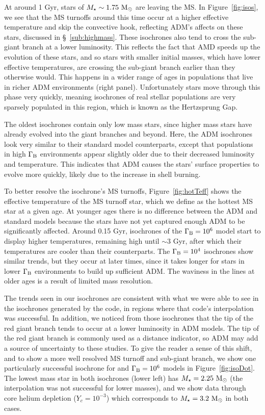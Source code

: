 \documentclass[useAMS,usenatbib]{mnras}
\begin{document}
At around 1 Gyr, stars of $M_{\star} \sim 1.75 \ \mathrm{M}_{\odot}$ are leaving the MS. In Figure~\ref{fig:isos}, we see that the MS turnoffs around this time occur at a higher effective temperature and skip the convective hook, reflecting ADM's affects on these stars, discussed in \S~\ref{sub:highmass}. These isochrones also tend to cross the sub-giant branch at a lower luminosity. This reflects the fact that AMD speeds up the evolution of these stars, and so stars with smaller initial masses, which have lower effective temperatures, are crossing the sub-giant branch earlier than they otherwise would. This happens in a wider range of ages in populations that live in richer ADM environments (right panel). Unfortunately stars move through this phase very quickly, meaning isochrones of real stellar populations are very sparsely populated in this region, which is known as the Hertzsprung Gap.

The oldest isochrones contain only low mass stars, since higher mass stars have already evolved into the giant branches and beyond. Here, the ADM isochrones look very similar to their standard model counterparts, except that populations in high $\Gamma_\mathrm{B}$ environments appear slightly older due to their decreased luminosity and temperature. This indicates that ADM causes the stars' surface properties to evolve more quickly, likely due to the increase in shell burning.

To better resolve the isochrone's MS turnoffs, Figure~\ref{fig:hotTeff} shows the effective temperature of the MS turnoff star, which we define as the hottest MS star at a given age. At younger ages there is no difference between the ADM and standard models because the stars have not yet captured enough ADM to be significantly affected. Around 0.15 Gyr, isochrones of the $\Gamma_\mathrm{B} = 10^{6}$ model start to display higher temperatures, remaining high until $\sim 3$ Gyr, after which their temperatures are cooler than their \nodm counterparts. The $\Gamma_\mathrm{B} = 10^{4}$ isochrones show similar trends, but they occur at later times, since it takes longer for stars in lower $\Gamma_\mathrm{B}$ environments to build up sufficient ADM. The waviness in the lines at older ages is a result of limited mass resolution.

The trends seen in our isochrones are consistent with what we were able to see in the isochrones generated by the \mist code, in regions where that code's interpolation was successful. In addition, we noticed from those isochrones that the tip of the red giant branch tends to occur at a lower luminosity in ADM models. The tip of the red giant branch is commonly used as a distance indicator, 
so ADM may add a source of uncertainty to these studies. 
To give the reader a sense of this shift, and to show a more well resolved MS turnoff and sub-giant branch, we show one particularly successful \mist isochrone for \nodm and $\Gamma_\mathrm{B} = 10^{6}$ models in Figure~\ref{fig:isoDot}. The lowest mass star in both isochrones (lower left) has $M_{\star} = 2.25 \ \mathrm{M}_{\odot}$ (the interpolation was not successful for lower masses), and we show data through core helium depletion ($Y_c = 10^{-3}$) which corresponds to $M_{\star} = 3.2 \ \mathrm{M}_{\odot}$ in both cases.
\end{document}
